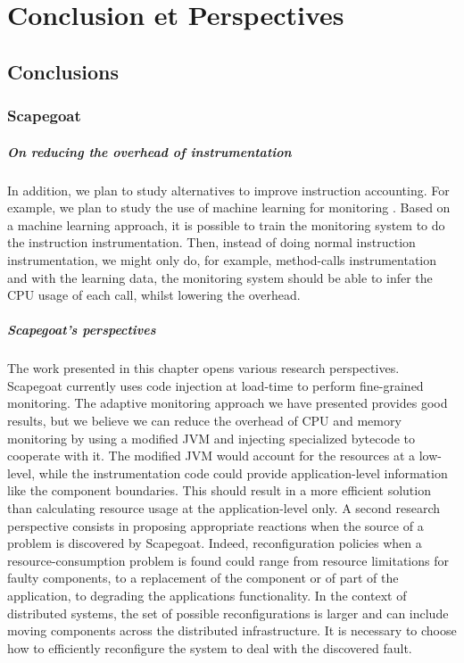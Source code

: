 \chapter{Conclusion et Perspectives}
\label{chap:ccl}

\section{Conclusions}


\subsection{Scapegoat}

\paragraph{On reducing the overhead of instrumentation}
In addition, we plan to study alternatives to improve instruction accounting. %
For example, we plan to study the use of machine learning for monitoring \cite{tesauro2006hybrid}. Based on a machine learning approach, it is possible to train the monitoring system to do the instruction instrumentation. Then, instead of doing normal instruction instrumentation, we might only do, for example, method-calls instrumentation and with the learning data, the monitoring system should be able to infer the CPU usage of each call, whilst lowering the overhead.

\paragraph{Scapegoat's perspectives}
The work presented in this chapter opens various research perspectives. 
Scapegoat currently uses code injection at load-time to perform fine-grained monitoring. 
The adaptive monitoring approach we have presented provides good results, but we believe we can reduce the overhead of CPU and memory monitoring by using a modified JVM and injecting specialized bytecode to cooperate with it.
The modified JVM would account for the resources at a low-level, while the instrumentation code could provide application-level information like the component boundaries. 
This should result in a more efficient solution than calculating resource usage at the application-level only.
A second research perspective consists in proposing appropriate reactions when the source of a problem is discovered by Scapegoat. 
Indeed, reconfiguration policies when a resource-consumption problem is found could range from resource limitations for faulty components, to a replacement of the component or of part of the application, to degrading the applications functionality.
In the context of distributed systems, the set of possible reconfigurations is larger and can include moving components across the distributed infrastructure.
It is necessary to choose how to efficiently reconfigure the system to deal with the discovered fault.


